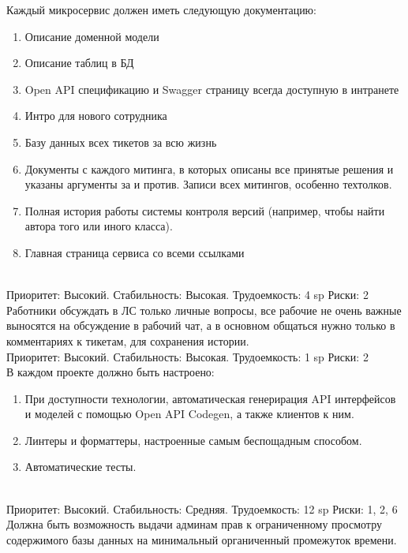 
Каждый микросервис должен иметь следующую документацию:
\begin{enumerate}
      \item Описание доменной модели
      \item Описание таблиц в БД
      \item Open API спецификацию и Swagger страницу
            всегда доступную в интранете
      \item Интро для нового сотрудника
      \item Базу данных всех тикетов за всю жизнь
      \item Документы с каждого митинга, в которых описаны
            все принятые решения и указаны аргументы
            за и против. Записи всех митингов, особенно
            техтолков.
      \item Полная история работы системы контроля версий
            (например, чтобы найти автора того или иного класса).
      \item Главная страница сервиса со всеми ссылками
\end{enumerate}\\

Приоритет: Высокий. Стабильность: Высокая. Трудоемкость: 4 sp
Риски: 2\\

Работники обсуждать в ЛС только личные вопросы, все рабочие
не очень важные выносятся на обсуждение в рабочий чат,
а в основном общаться нужно только в комментариях к тикетам,
для сохранения истории.\\

Приоритет: Высокий. Стабильность: Высокая. Трудоемкость: 1 sp
Риски: 2\\

В каждом проекте должно быть настроено:
\begin{enumerate}
      \item При доступности технологии, автоматическая
            генерирация API интерфейсов и моделей с помощью
            Open API Codegen, а также клиентов к ним.
      \item Линтеры и форматтеры, настроенные самым беспощадным способом.
      \item Автоматические тесты.
\end{enumerate}\\

Приоритет: Высокий. Стабильность: Средняя. Трудоемкость: 12 sp
Риски: 1, 2, 6\\

Должна быть возможность выдачи админам прав к ограниченному
просмотру содержимого базы данных на минимальный органиченный
промежуток времени.\\


